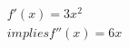 \documentclass[preview]{standalone}
\begin{document}
\begin{align*}
f'(x) = 3x^2 \\implies f''(x) = 6x
\end{align*}
\end{document}
